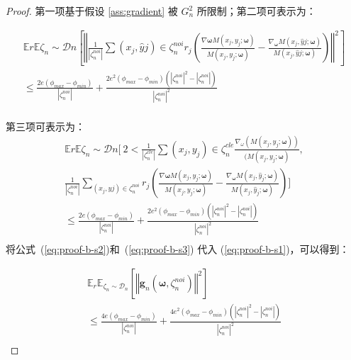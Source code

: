 \begin{proof}
\noindent 第一项基于假设 \ref{ass:gradient} 被 $G_n^2$ 所限制；第二项可表示为：%

\begin{multline}\label{eq:proof-b-s2}
\mathbb{E}{r}\mathbb{E}{\zeta_n\sim \mathcal{D}n}\left[\left\Vert\frac{1}{|\zeta_n^{noi}|}\sum{\left(x_j,\hat{y}j\right)\in \zeta_n^{noi}}r_j\left( \frac{\nabla{\boldsymbol{\omega}} M\left(x_j, y_j; \boldsymbol{\omega}\right)}{M\left(x_j, y_j; \boldsymbol{\omega}\right)}-\frac{\nabla_{\boldsymbol{\omega}} M\left(x_j, \hat{y}j; \boldsymbol{\omega}\right)}{M\left(x_j, \hat{y}j; \boldsymbol{\omega}\right)} \right)\right\Vert^2\right]\\
\leq \frac{2e\left(\phi_{max}-\phi_{min}\right)}{|\zeta_n^{noi}|}+\frac{2e^2\left(\phi_{max}-\phi_{min}\right)\left(|\zeta_n^{noi}|^2-|\zeta_n^{noi}|\right)}{|\zeta_n^{noi}|^2}\\
\end{multline}

\noindent 第三项可表示为：
\begin{multline}\label{eq:proof-b-s3}
\mathbb{E}{r}\mathbb{E}{\zeta_n\sim \mathcal{D}n}\Biggl[\ 2<\frac{1}{|\zeta_n^{cle}|}\sum{\left(x_j,y_j\right)\in \zeta_n^{cle}}\frac{ \nabla_\omega \left(M\left(x_j, y_j; \boldsymbol{\omega}\right)\right)}{(M\left(x_j, y_j; \boldsymbol{\omega}\right)},\\
\frac{1}{|\zeta_n^{noi}|}\sum_{\left(x_j,\hat{y}j\right)\in \zeta_n^{noi}}r_j\left( \frac{\nabla{\boldsymbol{\omega}} M\left(x_j, y_j; \boldsymbol{\omega}\right)}{M\left(x_j, y_j; \boldsymbol{\omega}\right)}-\frac{\nabla_{\boldsymbol{\omega}} M\left(x_j, \hat{y}_j; \boldsymbol{\omega}\right)}{M\left(x_j, \hat{y}_j; \boldsymbol{\omega}\right)} \right)\Biggl]\\
\leq \frac{2e\left(\phi_{max}-\phi_{min}\right)}{|\zeta_n^{noi}|}+\frac{2e^2\left(\phi_{max}-\phi_{min}\right)\left(|\zeta_n^{noi}|^2-|\zeta_n^{noi}|\right)}{|\zeta_n^{noi}|^2}\\
\end{multline}
将公式~(\ref{eq:proof-b-s2})和~(\ref{eq:proof-b-s3}) 代入 (\ref{eq:proof-b-s1})，可以得到：

\begin{multline}\label{eq:proof-b-s4}
\mathbb{E}_{r}\mathbb{E}_{\zeta_n\sim \mathcal{D}_n}\left[\left\Vert \boldsymbol{g}_n\left(\boldsymbol{\omega}, \zeta_n^{noi}\right) \right\Vert^2\right]\\
\leq \frac{4e\left(\phi_{max}-\phi_{min}\right)}{|\zeta_n^{noi}|}+\frac{4e^2\left(\phi_{max}-\phi_{min}\right)\left(|\zeta_n^{noi}|^2-|\zeta_n^{noi}|\right)}{|\zeta_n^{noi}|^2}\\
\end{multline}


\end{proof}

